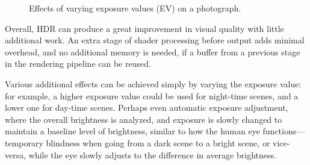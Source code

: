\documentclass[11pt, oneside]{report}
\begin{document}
\begin{figure}[!htbp]
  \centering
  \hfill
  \hfill
  \hfill
  \hfill
  \caption{Effects of varying exposure values (EV) on a photograph.}
\end{figure}

Overall, HDR can produce a great improvement in visual quality with little additional work. An extra stage of shader processing before output adds minimal overhead, and no additional memory is needed, if a buffer from a previous stage in the rendering pipeline can be reused.

Various additional effects can be achieved simply by varying the exposure value: for example, a higher exposure value could be used for night-time scenes, and a lower one for day-time scenes. Perhaps even automatic exposure adjustment, where the overall brightness is analyzed, and exposure is slowly changed to maintain a baseline level of brightness, similar to how the human eye functions---temporary blindness when going from a dark scene to a bright scene, or vice-versa, while the eye slowly adjusts to the difference in average brightness.
\end{document}
